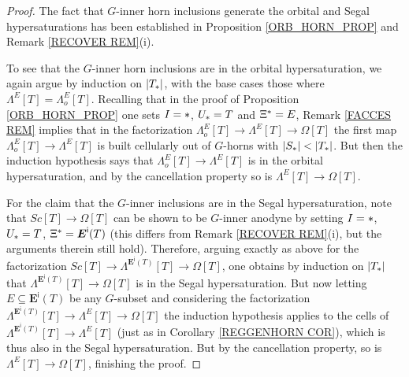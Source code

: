 \documentclass[a4paper,10pt
]{article}%
\begin{document}
\begin{proof}
	The fact that $G$-inner horn inclusions generate the orbital and Segal hypersaturations has been established in Proposition \ref{ORB_HORN_PROP} and Remark \ref{RECOVER REM}(i).
	
	To see that the $G$-inner horn inclusions are in the orbital hypersaturation, we again argue by induction on $|T_{\**}|$, with the base cases those where $\Lambda^{E} [T]=\Lambda^{E}_o [T]$.
	Recalling that in the proof of Proposition \ref{ORB_HORN_PROP}
	one sets
	$I=\**$, $U_{\**} = T$ and $\Xi^{\**} = E$,
	Remark \ref{FACCES REM} implies that in the factorization
	$\Lambda_o^E[T] \to \Lambda^E[T] \to \Omega[T]$
	the first map $\Lambda_o^E[T] \to \Lambda^E[T]$ is built cellularly out of $G$-horns with $|S_{\**}| < |T_{\**}|$.
	But then the induction hypothesis says that 
	$\Lambda_o^E[T] \to \Lambda^E[T]$ is in the orbital hypersaturation, and by the cancellation property so is $\Lambda^E[T] \to \Omega[T]$.
	
	For the claim that the $G$-inner inclusions are in the Segal hypersaturation,
	note that $Sc[T] \to \Omega[T]$ can be shown to be $G$-inner anodyne by setting $I=\**$, $U_{\**} = T$, $\Xi^{\**} = \boldsymbol{E}^{\mathsf{i}}(T)$
	(this differs from Remark \ref{RECOVER REM}(i), but the arguments therein still hold).
	Therefore, arguing exactly as above for the factorization
	$Sc[T] \to \Lambda^{\boldsymbol{E}^{\mathsf{i}}(T)}[T] \to \Omega[T]$,
	one obtains by induction on $|T_{\**}|$ that
	$\Lambda^{\boldsymbol{E}^{\mathsf{i}}(T)}[T] \to \Omega[T]$
	is in the Segal hypersaturation. 
	But now letting $E \subseteq \boldsymbol{E}^{\mathsf{i}}(T)$ be any $G$-subset and considering the factorization
	$\Lambda^{\boldsymbol{E}^{\mathsf{i}}(T)}[T] \to 
	\Lambda^{E}[T] \to
	\Omega[T]$ the induction hypothesis applies to the cells of
	$\Lambda^{\boldsymbol{E}^{\mathsf{i}}(T)}[T] \to \Lambda^{E}[T]$
	(just as in Corollary \ref{REGGENHORN COR}),
	which is thus also in the Segal hypersaturation.
	But by the cancellation property, so is 
	$\Lambda^{E}[T] \to \Omega[T]$, finishing the proof.
\end{proof}
\end{document}
